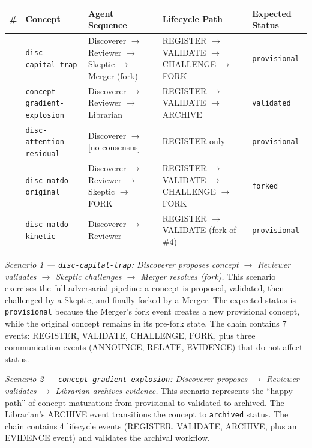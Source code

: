 \begin{longtable}[]{@{}>{\centering\arraybackslash}p{}
  >{\raggedright\arraybackslash}p{}
  >{\raggedright\arraybackslash}p{}
  >{\raggedright\arraybackslash}p{}
  >{\centering\arraybackslash}p{}@{}}
\toprule
\#
& Concept
& Agent Sequence
& Lifecycle Path
& Expected Status
\\
\midrule
\endhead
\bottomrule
\endlastfoot
1 & \texttt{disc-capital-trap} & Discoverer \(\rightarrow\) Reviewer \(\rightarrow\) Skeptic \(\rightarrow\) Merger (fork) & REGISTER \(\rightarrow\) VALIDATE \(\rightarrow\) CHALLENGE \(\rightarrow\) FORK & \texttt{provisional} \\
2 & \texttt{concept-gradient-explosion} & Discoverer \(\rightarrow\) Reviewer \(\rightarrow\) Librarian & REGISTER \(\rightarrow\) VALIDATE \(\rightarrow\) ARCHIVE & \texttt{validated} \\
3 & \texttt{disc-attention-residual} & Discoverer \(\rightarrow\) {[}no consensus{]} & REGISTER only & \texttt{provisional} \\
4 & \texttt{disc-matdo-original} & Discoverer \(\rightarrow\) Reviewer \(\rightarrow\) Skeptic \(\rightarrow\) FORK & REGISTER \(\rightarrow\) VALIDATE \(\rightarrow\) CHALLENGE \(\rightarrow\) FORK & \texttt{forked} \\
5 & \texttt{disc-matdo-kinetic} & Discoverer \(\rightarrow\) Reviewer & REGISTER \(\rightarrow\) VALIDATE (fork of \#4) & \texttt{provisional} \\
\end{longtable}

\emph{Scenario 1 --- \texttt{disc-capital-trap}: Discoverer proposes concept \(\rightarrow\) Reviewer validates \(\rightarrow\) Skeptic challenges \(\rightarrow\) Merger resolves (fork).} This scenario exercises the full adversarial pipeline: a concept is proposed, validated, then challenged by a Skeptic, and finally forked by a Merger. The expected status is \texttt{provisional} because the Merger's fork event creates a new provisional concept, while the original concept remains in its pre-fork state. The chain contains 7 events: REGISTER, VALIDATE, CHALLENGE, FORK, plus three communication events (ANNOUNCE, RELATE, EVIDENCE) that do not affect status.

\emph{Scenario 2 --- \texttt{concept-gradient-explosion}: Discoverer proposes \(\rightarrow\) Reviewer validates \(\rightarrow\) Librarian archives evidence.} This scenario represents the ``happy path'' of concept maturation: from provisional to validated to archived. The Librarian's ARCHIVE event transitions the concept to \texttt{archived} status. The chain contains 4 lifecycle events (REGISTER, VALIDATE, ARCHIVE, plus an EVIDENCE event) and validates the archival workflow.

